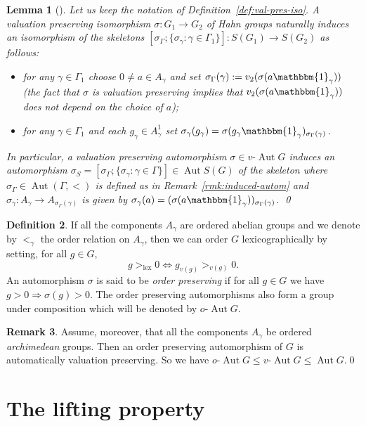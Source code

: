 \documentclass[12pt,a4paper,reqno,openright]{amsart}
\newcommand{\ra}{\rightarrow}
\newcommand{\Ra}{\Rightarrow}
\renewcommand{\1}{\mathbbm{1}}
\newcommand{\g}{\gamma}
\newcommand{\G}{\Gamma}
\DeclareMathOperator{\Aut}{Aut}
\DeclareMathOperator{\lex}{lex}
\newcommand{\vAut}{v\text{-}\Aut}
\newcommand{\oAut}{o\text{-}\Aut}
\theoremstyle{definition}
\newtheorem{defn}{Definition}[section]
\theoremstyle{plain}
\newtheorem{lemma}[defn]{Lemma}
\theoremstyle{plain}
\theoremstyle{plain}
\theoremstyle{plain}
\theoremstyle{plain}
\theoremstyle{plain}
\theoremstyle{plain}
\theoremstyle{plain}
\theoremstyle{definition}
\theoremstyle{definition}
\theoremstyle{plain}
\theoremstyle{definition}
\theoremstyle{definition}
\newtheorem{rmk}[defn]{Remark}
\theoremstyle{plain}
\theoremstyle{plain}
\theoremstyle{plain}
\begin{document}
\begin{lemma}[{\cite[Lemma~0.2]{salma-monograph}}]
	\label{lemma:induced-autom-skeleton}
	Let us keep the notation of Definition~\ref{def:val-pres-iso}.
	A valuation preserving isomorphism $ \sigma\colon G_1\ra G_2 $ of Hahn groups naturally induces an isomorphism of the skeletons $ [\sigma_\Gamma;\{\sigma_\gamma:\gamma\in\Gamma_1\}] \colon S(G_1)\ra S(G_2) $ as follows:
	\begin{itemize}
		\item for any $ \g\in\Gamma_1 $ choose $ 0\neq a \in A_\g $ and set $ \sigma_\Gamma(\g) := v_2(\sigma(a\1_\g)) $ (the fact that $ \sigma $ is valuation preserving implies that $ v_2(\sigma(a\1_\g)) $ does not depend on the choice of $ a $);
	\item 
	for any $ \gamma\in\Gamma_1 $ and each $ g_\gamma\in A^1_\gamma $ set $ \sigma_\gamma(g_\gamma) = \sigma(g_\gamma\1_\g)_{\sigma_\Gamma(\gamma)} $.
	\end{itemize}	
	In particular, a valuation preserving automorphism $ \sigma\in\vAut G $ induces an automorphism $ \sigma_S = [\sigma_\Gamma;\{\sigma_\gamma:\gamma\in\Gamma\}]\in\Aut S(G) $ of the skeleton where $ \sigma_\Gamma\in\Aut(\G, <) $ is defined as in Remark~\ref{rmk:induced-autom} and $ \sigma_\gamma\colon A_\gamma\to A_{\sigma_\Gamma(\gamma)} $ is given by $ \sigma_\gamma(a) = (\sigma(a\1_\gamma))_{\sigma_\Gamma(\gamma)} $.
	\qed
\end{lemma}

\begin{defn}\label{def:lex-order}\label{def:oAut}
	If all the components $ A_{\gamma} $ are ordered abelian groups and we denote by $ <_\gamma $ the order relation on $ A_\gamma $, then we can order $ G $ lexicographically by setting, for all $ g \in G $,
	\[g>_{\lex}0\iff g_{v(g)}>_{v(g)}0. \]	
	An automorphism $ \sigma $ is said to be \emph{order preserving} if for all $ g\in G $ we have $ g>0\Ra \sigma(g)>0 $. The order preserving automorphisms also form a group under composition which will be denoted by $ \oAut G $.
\end{defn}

\begin{rmk}\label{rmk:oAut<vAut}
	Assume, moreover, that all the components $ A_\gamma $ be ordered \textit{archimedean} groups.
	Then an order preserving automorphism of $ G $ is automatically valuation preserving.
	So we have $ \oAut G\leq \vAut G\leq \Aut G. $\qed
\end{rmk}

\section{The lifting property}\label{sec:the-lifting-property}
\end{document}
